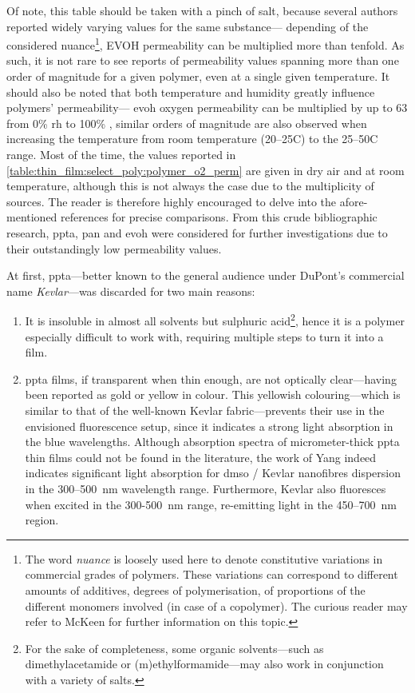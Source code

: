 Of note, this table should be taken with a pinch of salt, because several authors reported widely varying values for the same substance---\eg{} depending of the considered nuance\footnote{The word \emph{nuance} is loosely used here to denote constitutive variations in commercial grades of polymers. These variations can correspond to different amounts of additives, degrees of polymerisation, of proportions of the different monomers involved (in case of a copolymer). The curious reader may refer to McKeen for further information on this topic\cite[Chap.~2]{mckeen2017}.}, EVOH permeability can be multiplied more than tenfold\cite[p.~185]{mckeen2017}. As such, it is not rare to see reports of permeability values spanning more than one order of magnitude for a given polymer, even at a single given temperature\cite[App. II]{massey2003}. It should also be noted that both temperature and humidity greatly influence polymers' permeability---\eg{} \gls{evoh} oxygen permeability can be multiplied by up to 63 from 0\% \gls{rh} to 100\% \cite[pp. 264--5]{massey2003}, similar orders of magnitude are also observed when increasing the temperature from room temperature (20--25{\degree}C) to the 25--50{\degree}C range\cite[App. II]{massey2003}. Most of the time, the values reported in \ref{table:thin_film:select_poly:polymer_o2_perm} are given in dry air and at room temperature, although this is not always the case due to the multiplicity of sources. The reader is therefore highly encouraged to delve into the afore-mentioned references for precise comparisons. From this crude bibliographic research, \gls{ppta}, \gls{pan} and \gls{evoh} were considered for further investigations due to their outstandingly low permeability values.

At first, \gls{ppta}---better known to the general audience under DuPont's commercial name \emph{Kevlar}---was discarded for two main reasons:
\begin{enumerate}
	\item It is insoluble in almost all solvents but sulphuric acid\cite{sokolova1974, arpin1977}\footnote{For the sake of completeness, some organic solvents---such as dimethylacetamide or (m)ethylformamide---may also work in conjunction with a variety of salts\cite{westerhof2009phd}.}, hence it is a polymer especially difficult to work with, requiring multiple steps to turn it into a film\cite{flood1982, fujita1989}.
	\item \Gls{ppta} films, if transparent when thin enough, are not optically clear---having been reported as gold or yellow in colour\cite{fujita1989, weinkauf1992, lu2018}. This yellowish colouring---which is similar to that of the well-known Kevlar fabric---prevents their use in the envisioned fluorescence setup, since it indicates a strong light absorption in the blue wavelengths. Although absorption spectra of micrometer-thick \gls{ppta} thin films could not be found in the literature, the work of Yang \etal{} indeed indicates significant light absorption for \gls{dmso} / Kevlar nanofibres dispersion in the 300--500~nm wavelength range\cite{yang2015}. Furthermore, Kevlar also fluoresces when excited in the 300-500~nm range, re-emitting light in the 450--700~nm region\cite{penn1979}.
\end{enumerate}

